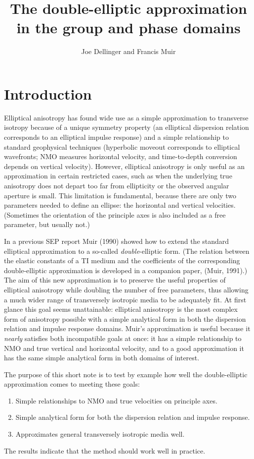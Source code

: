 \title{The double-elliptic approximation \\ in the group and phase domains}
\author{Joe Dellinger and Francis Muir}

\section{Introduction}
Elliptical anisotropy has found wide use as a simple approximation
to transverse isotropy because of a unique symmetry property
(an elliptical dispersion relation corresponds to an elliptical
impulse response) and a simple relationship to standard geophysical
techniques (hyperbolic moveout corresponds to elliptical wavefronts;
NMO measures horizontal velocity, and time-to-depth conversion
depends on vertical velocity).
However, elliptical anisotropy is only useful as an approximation
in certain restricted cases, such as when the underlying true anisotropy
does not depart too far from ellipticity
or the observed angular aperture is small.
This limitation is fundamental, because there are only two parameters
needed to define an ellipse: the horizontal and vertical velocities.
(Sometimes the orientation of the principle axes is also included as a
free parameter, but usually not.)

In a previous SEP report Muir (1990) showed how to extend the standard
elliptical approximation to a so-called {\em double\/}-elliptic form. (The 
relation between the elastic constants of a TI medium 
and the coefficients of the corresponding
double-elliptic approximation is
developed in a companion paper, (Muir, 1991).)
The aim of this new approximation is to preserve the useful properties
of elliptical anisotropy while doubling the number of free parameters,
thus allowing a much wider range of transversely isotropic media to
be adequately fit.
At first glance this goal seems unattainable: elliptical anisotropy 
is the most complex form of anisotropy possible with a simple analytical form 
in both the dispersion relation and impulse response domains.
Muir's approximation is useful because it {\em nearly\/} satisfies
both incompatible goals at once:
it has a simple relationship to NMO and
true vertical and horizontal velocity, and to a good approximation
it has the same simple analytical form in both domains of interest.

The purpose of this short note is to test by example how well
the double-elliptic approximation comes to meeting these goals:
\begin{enumerate}
\item Simple relationships to NMO and true velocities on principle axes.
\item Simple analytical form for both the dispersion relation and impulse 
response.
\item Approximates general transversely isotropic media well.
\end{enumerate}
The results indicate that the method should work well in practice.

